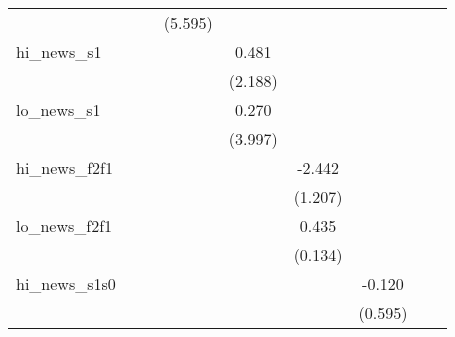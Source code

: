 {\begin{tabular}{l*{8}{c}}
            &                     &                     &     (5.595)         &                     &                     &                     &                     &                     \\
\addlinespace
hi\_news\_s1  &                     &                     &                     &       0.481         &                     &                     &                     &                     \\
            &                     &                     &                     &     (2.188)         &                     &                     &                     &                     \\
\addlinespace
lo\_news\_s1  &                     &                     &                     &       0.270         &                     &                     &                     &                     \\
            &                     &                     &                     &     (3.997)         &                     &                     &                     &                     \\
\addlinespace
hi\_news\_f2f1&                     &                     &                     &                     &      -2.442\sym{**} &                     &                     &                     \\
            &                     &                     &                     &                     &     (1.207)         &                     &                     &                     \\
\addlinespace
lo\_news\_f2f1&                     &                     &                     &                     &       0.435\sym{***}&                     &                     &                     \\
            &                     &                     &                     &                     &     (0.134)         &                     &                     &                     \\
\addlinespace
hi\_news\_s1s0&                     &                     &                     &                     &                     &      -0.120         &                     &                     \\
            &                     &                     &                     &                     &                     &     (0.595)         &                     &                     \\

\end{tabular}}
